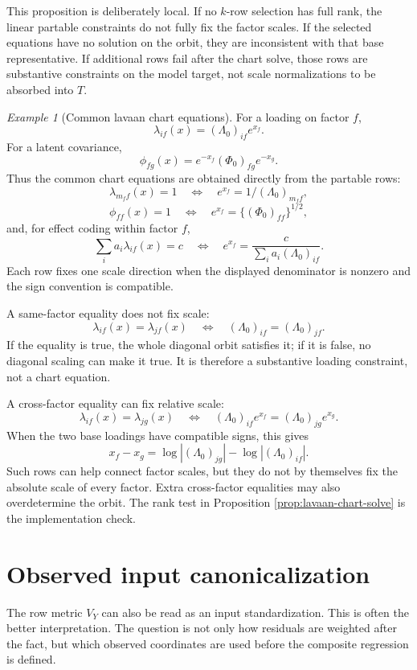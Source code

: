 \documentclass[11pt]{article}
\theoremstyle{plain}
\theoremstyle{remark}
\newtheorem*{example}{Example}
\begin{document}
This proposition is deliberately local. If no \(k\)-row selection has full
rank, the linear partable constraints do not fully fix the factor scales. If
the selected equations have no solution on the orbit, they are inconsistent
with that base representative. If additional rows fail after the chart solve,
those rows are substantive constraints on the model target, not scale
normalizations to be absorbed into \(T\).

\begin{example}[Common lavaan chart equations]
For a loading on factor \(f\),
\[
  \lambda_{if}(x)=(\Lambda_0)_{if}e^{x_f}.
\]
For a latent covariance,
\[
  \phi_{fg}(x)=
  e^{-x_f}(\Phi_0)_{fg}e^{-x_g}.
\]
Thus the common chart equations are obtained directly from the partable rows:
\[
  \lambda_{m_f f}(x)=1
  \quad\Longleftrightarrow\quad
  e^{x_f}=1/(\Lambda_0)_{m_f f},
\]
\[
  \phi_{ff}(x)=1
  \quad\Longleftrightarrow\quad
  e^{x_f}=\{(\Phi_0)_{ff}\}^{1/2},
\]
and, for effect coding within factor \(f\),
\[
  \sum_i a_i\lambda_{if}(x)=c
  \quad\Longleftrightarrow\quad
  e^{x_f}=
  \frac{c}{\sum_i a_i(\Lambda_0)_{if}} .
\]
Each row fixes one scale direction when the displayed denominator is nonzero
and the sign convention is compatible.

A same-factor equality does not fix scale:
\[
  \lambda_{if}(x)=\lambda_{jf}(x)
  \quad\Longleftrightarrow\quad
  (\Lambda_0)_{if}=(\Lambda_0)_{jf}.
\]
If the equality is true, the whole diagonal orbit satisfies it; if it is false,
no diagonal scaling can make it true. It is therefore a substantive loading
constraint, not a chart equation.

A cross-factor equality can fix relative scale:
\[
  \lambda_{if}(x)=\lambda_{jg}(x)
  \quad\Longleftrightarrow\quad
  (\Lambda_0)_{if}e^{x_f}
  =
  (\Lambda_0)_{jg}e^{x_g}.
\]
When the two base loadings have compatible signs, this gives
\[
  x_f-x_g
  =
  \log |(\Lambda_0)_{jg}|
  -
  \log |(\Lambda_0)_{if}|.
\]
Such rows can help connect factor scales, but they do not by themselves fix
the absolute scale of every factor. Extra cross-factor equalities may also
overdetermine the orbit. The rank test in Proposition
\ref{prop:lavaan-chart-solve} is the implementation check.
\end{example}

\section{Observed input canonicalization}

The row metric \(V_Y\) can also be read as an input standardization. This is
often the better interpretation. The question is not only how residuals are
weighted after the fact, but which observed coordinates are used before the
composite regression is defined.
\end{document}

